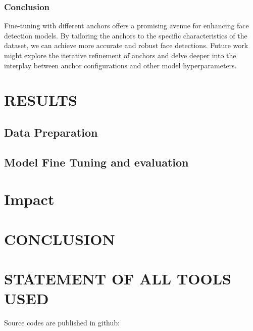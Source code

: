 \documentclass{article}
\begin{document}
\subsubsection{Conclusion}

Fine-tuning with different anchors offers a promising avenue for enhancing face detection models. By tailoring the anchors to the specific characteristics of the dataset, we can achieve more accurate and robust face detections. Future work might explore the iterative refinement of anchors and delve deeper into the interplay between anchor configurations and other model hyperparameters.


\section{RESULTS}
\label{sec:results}

\subsection{Data Preparation}
\label{ssec:data}


  \subsection{Model Fine Tuning and evaluation}
  \label{ssec:model}

\section{Impact}
  
\section{CONCLUSION}
\label{sec:conclusion}


\section{STATEMENT OF ALL TOOLS USED}
\label{sec:statementofalltoolsused}


Source codes are published in github: 





\vfill\pagebreak



\end{document}
